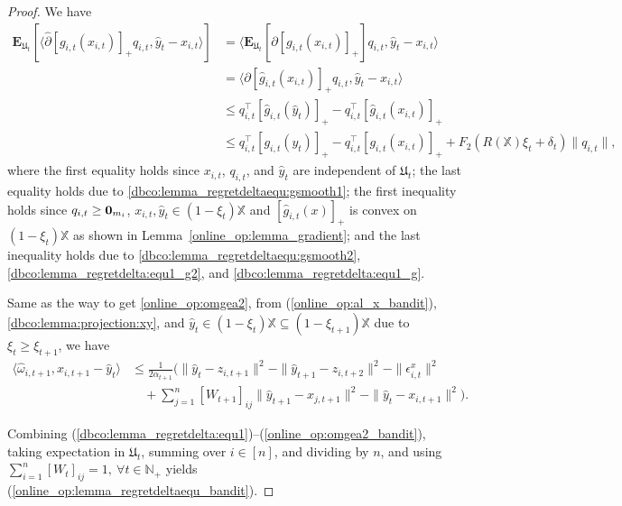 \documentclass[12pt,draftcls,onecolumn]{IEEEtran}%
\begin{document}
\begin{proof}
We have
\begin{align}\label{online_op:gyxdelta_bandit}
\mathbf{E}_{\mathfrak{U}_{t}}[\langle\hat{\partial}[g_{i,t}(x_{i,t})]_+ q_{i,t},\hat{y}_t-x_{i,t}\rangle]
&=\langle\mathbf{E}_{\mathfrak{U}_{t}}[\hat{\partial}[g_{i,t}(x_{i,t})]_+] q_{i,t},\hat{y}_t-x_{i,t}\rangle\nonumber\\
&=\langle\partial[\hat{g}_{i,t}(x_{i,t})]_+ q_{i,t},\hat{y}_t-x_{i,t}\rangle\nonumber\\
&\le q_{i,t}^\top [\hat{g}_{i,t}(\hat{y}_{t})]_+ -q_{i,t}^\top [\hat{g}_{i,t}(x_{i,t})]_+\nonumber\\
&\le q_{i,t}^\top[g_{i,t}(y_{t})]_+-q_{i,t}^\top [g_{i,t}(x_{i,t})]_++F_2(R(\mathbb{X})\xi_{t}+ \delta_{t})\|q_{i,t}\|,
\end{align}
where the first equality holds since $x_{i,t}$, $q_{i,t}$, and $\hat{y}_t$ are independent of $\mathfrak{U}_{t}$; the last equality holds due to \eqref{dbco:lemma_regretdeltaequ:gsmooth1}; the first inequality holds since $q_{i,t}\ge{\bf 0}_{m_i}$, $x_{i,t},\hat{y}_t\in(1-\xi_t)\mathbb{X}$ and $[\hat{g}_{i,t}(x)]_+$ is convex on $(1-\xi_{t})\mathbb{X}$ as shown in Lemma~\ref{online_op:lemma_gradient}; and the last inequality holds due to \eqref{dbco:lemma_regretdeltaequ:gsmooth2}, \eqref{dbco:lemma_regretdelta:equ1_g2}, and \eqref{dbco:lemma_regretdelta:equ1_g}.

Same as the way to get \eqref{online_op:omgea2}, from  (\ref{online_op:al_x_bandit}), \eqref{dbco:lemma:projection:xy}, and $\hat{y}_t\in(1-\xi_t)\mathbb{X}\subseteq(1-\xi_{t+1})\mathbb{X}$ due to $\xi_t\ge\xi_{t+1}$, we have
\begin{align}
\langle\hat{\omega}_{i,t+1},x_{i,t+1}-\hat{y}_t\rangle
&\le\frac{1}{2\alpha_{t+1}}\Big(\|\hat{y}_t-z_{i,t+1}\|^2-\|\hat{y}_{t+1}-z_{i,t+2}\|^2
-\|\epsilon^x_{i,t}\|^2\nonumber\\
&\quad+\sum_{j=1}^n[W_{t+1}]_{ij}\|\hat{y}_{t+1}-x_{j,t+1}\|^2-\|\hat{y}_t-x_{i,t+1}\|^2
\Big).\label{online_op:omgea2_bandit}
\end{align}

Combining (\ref{dbco:lemma_regretdelta:equ1})--(\ref{online_op:omgea2_bandit}), taking expectation in $\mathfrak{U}_{t}$, summing over $i\in[n]$, and dividing by $n$, and using $\sum_{i=1}^n[W_t]_{ij}=1,~\forall t\in\mathbb{N}_+$ yields
 (\ref{online_op:lemma_regretdeltaequ_bandit}).
\end{proof}
\end{document}
